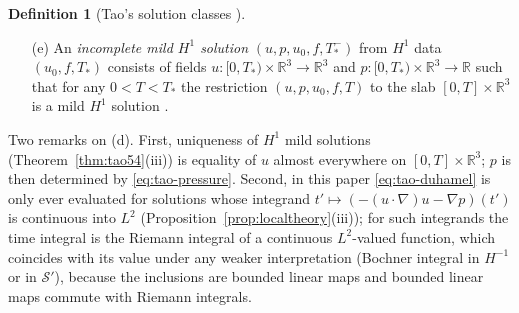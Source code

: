 \documentclass[11pt]{article}
\theoremstyle{definition}
\newtheorem{definition}[theorem]{Definition}
\theoremstyle{plain}
\newcommand{\R}{\mathbb R}
\begin{document}
\begin{definition}[Tao's solution classes {\cite[pp.~26--31]{Tao2013}}]
\begin{itemize}
\begin{equation}\label{eq:tao-duhamel}
 u(t)=e^{t\Delta}u_0+\int_0^te^{(t-t')\Delta}
 \bigl(-(u\cdot\nabla)u-\nabla p+f\bigr)(t')\,dt'
\end{equation}
of \eqref{eq:tao-ns} \cite[p.~31]{Tao2013}; the integral form is Tao's
(10), displayed on p.~29 for the periodic setting and invoked verbatim for
$\R^3$ on p.~31.  (Tao's own cross references on p.~29 point at ``(19)''
and ``(20)'' where ``(10)'' is meant, so that a reader checking the source
is not confused.)
\item[(e)] An \emph{incomplete mild $H^1$ solution} $(u,p,u_0,f,T_*^-)$
from $H^1$ data $(u_0,f,T_*)$ consists of fields $u:[0,T_*)\times\R^3\to
\R^3$ and $p:[0,T_*)\times\R^3\to\R$ such that for any $0<T<T_*$ the
restriction $(u,p,u_0,f,T)$ to the slab $[0,T]\times\R^3$ is a mild $H^1$
solution \cite[p.~56]{Tao2013}.
\end{itemize}
\end{definition}

Two remarks on (d).  First, uniqueness of $H^1$ mild solutions
(Theorem~\ref{thm:tao54}(iii)) is equality of $u$ almost everywhere on
$[0,T]\times\R^3$; $p$ is then determined by \eqref{eq:tao-pressure}.
Second, in this paper \eqref{eq:tao-duhamel} is only ever evaluated for
solutions whose integrand $t'\mapsto(-(u\cdot\nabla)u-\nabla p)(t')$ is
continuous into $L^2$ (Proposition~\ref{prop:localtheory}(iii)); for such
integrands the time integral is the Riemann integral of a continuous
$L^2$-valued function, which coincides with its value under any weaker
interpretation (Bochner integral in $H^{-1}$ or in $\mathcal S'$), because
the inclusions are bounded linear maps and bounded linear maps commute with
Riemann integrals.
\end{document}
